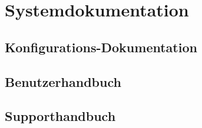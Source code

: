 \section{Systemdokumentation}
\subsection{Konfigurations-Dokumentation}
\subsection{Benutzerhandbuch}
\subsection{Supporthandbuch}
